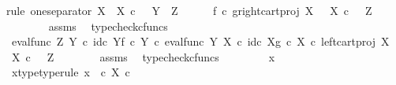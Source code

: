 \begin{isabellebody}
{\isacharparenleft}{\kern0pt}rule\ one{\isacharunderscore}{\kern0pt}separator{\isacharbrackleft}{\kern0pt}\ X\ {\isacharequal}{\kern0pt}\ {\isachardoublequoteopen}X\ {\isasymtimes}\isactrlsub c\ {\isasymone}{\isachardoublequoteclose}{\isacharcomma}{\kern0pt}\ \ Y\ {\isacharequal}{\kern0pt}\ Z{\isacharbrackright}{\kern0pt}{\isacharparenright}{\kern0pt}\isanewline
\ \ \ \ \isamarkupfalse%
\ {\isachardoublequoteopen}f\isactrlsup {\isasymflat}\ {\isasymcirc}\isactrlsub c\ {\isasymlangle}g\isactrlsup {\isasymflat}{\isacharcomma}{\kern0pt}right{\isacharunderscore}{\kern0pt}cart{\isacharunderscore}{\kern0pt}proj\ X\ {\isasymone}{\isasymrangle}\ {\isacharcolon}{\kern0pt}\ X\ {\isasymtimes}\isactrlsub c\ {\isasymone}\ {\isasymrightarrow}\ Z{\isachardoublequoteclose}\isanewline
\ \ \ \ \ \ \isamarkupfalse%
\ assms\ \isamarkupfalse%
\ typecheck{\isacharunderscore}{\kern0pt}cfuncs\isanewline
\ \ \ \ \isamarkupfalse%
\ {\isachardoublequoteopen}{\isacharparenleft}{\kern0pt}{\isacharparenleft}{\kern0pt}eval{\isacharunderscore}{\kern0pt}func\ Z\ Y\ {\isasymcirc}\isactrlsub c\ {\isasymlangle}id\isactrlsub c\ Y{\isacharcomma}{\kern0pt}f\ {\isasymcirc}\isactrlsub c\ {\isasymbeta}\isactrlbsub Y\isactrlesub {\isasymrangle}{\isacharparenright}{\kern0pt}\ {\isasymcirc}\isactrlsub c\ eval{\isacharunderscore}{\kern0pt}func\ Y\ X\ {\isasymcirc}\isactrlsub c\ {\isasymlangle}id\isactrlsub c\ X{\isacharcomma}{\kern0pt}g\ {\isasymcirc}\isactrlsub c\ {\isasymbeta}\isactrlbsub X\isactrlesub {\isasymrangle}{\isacharparenright}{\kern0pt}\ {\isasymcirc}\isactrlsub c\ left{\isacharunderscore}{\kern0pt}cart{\isacharunderscore}{\kern0pt}proj\ X\ {\isasymone}\ {\isacharcolon}{\kern0pt}\ X\ {\isasymtimes}\isactrlsub c\ {\isasymone}\ {\isasymrightarrow}\ Z{\isachardoublequoteclose}\isanewline
\ \ \ \ \ \ \isamarkupfalse%
\ assms\ \isamarkupfalse%
\ typecheck{\isacharunderscore}{\kern0pt}cfuncs\isanewline
\ \ \isamarkupfalse%
\isanewline
\ \ \ \ \isamarkupfalse%
\ x{}\ \isanewline
\ \ \ \ \isamarkupfalse%
\ x{}{\isacharunderscore}{\kern0pt}type{\isacharbrackleft}{\kern0pt}type{\isacharunderscore}{\kern0pt}rule{\isacharbrackright}{\kern0pt}{\isacharcolon}{\kern0pt}\ {\isachardoublequoteopen}x{}\ \ {\isasymin}\isactrlsub c\ {\isacharparenleft}{\kern0pt}X\ {\isasymtimes}\isactrlsub c\ {\isasymone}{\isacharparenright}{\kern0pt}{\isachardoublequoteclose}\isanewline
\ \ \ \ \isamarkupfalse%

\end{isabellebody}
